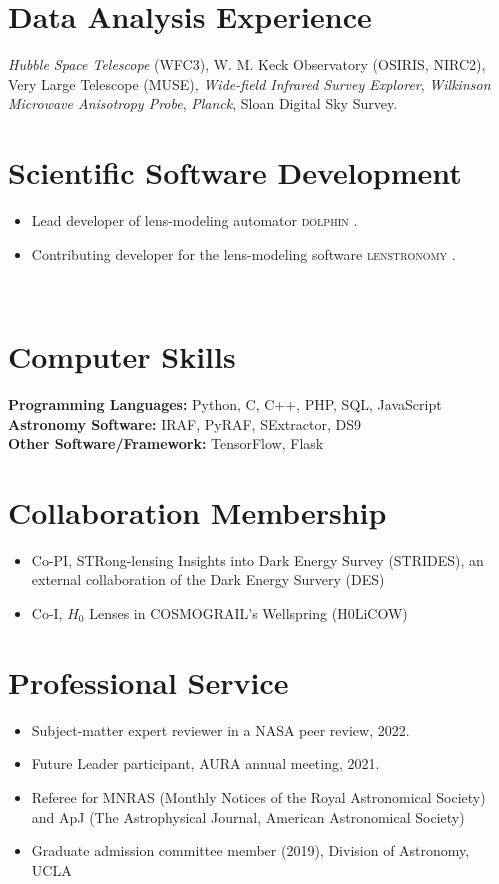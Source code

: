 \documentclass[margin, line]{res}
\newenvironment{list2}{
  \begin{list}{$\bullet$}{%
      \setlength{\itemsep}{0in}
      \setlength{\parsep}{0in} \setlength{\parskip}{0in}
      \setlength{\topsep}{0in} \setlength{\partopsep}{0in} 
      \setlength{\leftmargin}{0.2in}}}{\end{list}}
\begin{document}
\begin{resume}
\section{\sc Data Analysis Experience}
\textit{Hubble Space Telescope} (WFC3), 
W. M. Keck Observatory (OSIRIS, NIRC2),
Very Large Telescope (MUSE),
{\it Wide-field Infrared Survey Explorer},
{\it Wilkinson Microwave Anisotropy Probe},
{\it Planck},
Sloan Digital Sky Survey.

\section{\sc Scientific Software Development} 
\begin{itemize}
	\item Lead developer of lens-modeling automator \textsc{dolphin} \href{https://github.com/ajshajib/dolphin}{\faGithub}.
	\item Contributing developer for the lens-modeling software \textsc{lenstronomy} \href{https://github.com/sibirrer/lenstronomy}{\faGithub}.
\end{itemize}
\\

\section{\sc Computer Skills} 
\textbf{Programming Languages:} Python, C, C++, PHP, SQL, JavaScript \\
\textbf{Astronomy Software:} IRAF, PyRAF, SExtractor, DS9 \\
\textbf{Other Software/Framework:} TensorFlow, Flask


\section{\sc Collaboration Membership}
\begin{itemize}
	\item Co-PI, STRong-lensing Insights into Dark Energy Survey (STRIDES), an external collaboration of the Dark Energy Survery (DES)
	\item Co-I, $H_0$ Lenses in COSMOGRAIL's Wellspring (H0LiCOW)
\end{itemize}

\section{\sc Professional Service}
\begin{itemize}
\item Subject-matter expert reviewer in a NASA peer review, 2022.
\item Future Leader participant, AURA annual meeting, 2021.
\item Referee for MNRAS (Monthly Notices of the Royal Astronomical Society) and ApJ (The Astrophysical Journal, American Astronomical Society)
\item Graduate admission committee member (2019), Division of Astronomy, UCLA
\end{itemize}


\end{resume}
\end{document}
